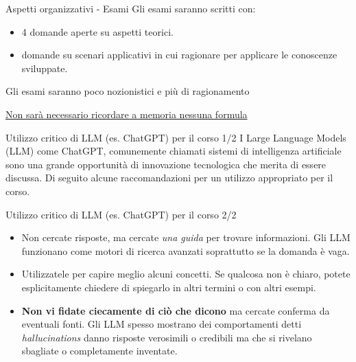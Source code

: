 \documentclass[
  ignorenonframetext,
]{beamer}
\providecommand{\tightlist}{%
  \setlength{\itemsep}{0pt}\setlength{\parskip}{0pt}}
\begin{document}
\begin{frame}{Aspetti organizzativi - Esami}
\label{aspetti-organizzativi---esami}
Gli esami saranno scritti con:

\begin{itemize}
\tightlist
\item
  4 domande aperte su aspetti teorici.
\item
  domande su scenari applicativi in cui ragionare per applicare le
  conoscenze sviluppate.
\end{itemize}

Gli esami saranno poco nozionistici e più di ragionamento

\underline{Non sarà necessario ricordare a memoria nessuna formula}
\end{frame}

\begin{frame}{Utilizzo critico di LLM (es. ChatGPT) per il corso 1/2}
\label{utilizzo-critico-di-llm-es.-chatgpt-per-il-corso-12}
I Large Language Models (LLM) come ChatGPT, comunemente chiamati sistemi
di intelligenza artificiale sono una grande opportunità di innovazione
tecnologica che merita di essere discussa. Di seguito alcune
raccomandazioni per un utilizzo appropriato per il corso.
\end{frame}

\begin{frame}{Utilizzo critico di LLM (es. ChatGPT) per il corso 2/2}
\label{utilizzo-critico-di-llm-es.-chatgpt-per-il-corso-22}
\begin{itemize}
\item
  Non cercate risposte, ma cercate \emph{una guida} per trovare
  informazioni. Gli LLM funzionano come motori di ricerca avanzati
  soprattutto se la domanda è vaga.
\item
  Utilizzatele per capire meglio alcuni concetti. Se qualcosa non è
  chiaro, potete esplicitamente chiedere di spiegarlo in altri termini o
  con altri esempi.
\item
  \textbf{Non vi fidate ciecamente di ciò che dicono} ma cercate
  conferma da eventuali fonti. Gli LLM spesso mostrano dei comportamenti
  detti \emph{hallucinations} danno risposte verosimili o credibili ma
  che si rivelano sbagliate o completamente inventate.
\end{itemize}
\end{frame}
\end{document}
